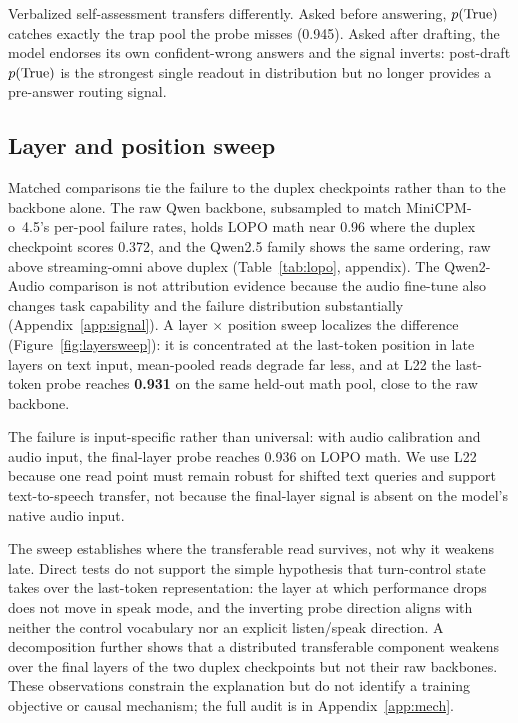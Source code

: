 Verbalized self-assessment transfers differently. Asked before
answering, $p(\mathrm{True})$ catches exactly the trap pool the probe misses
(0.945). Asked after drafting, the model endorses its own
confident-wrong answers and the signal inverts: post-draft $p(\mathrm{True})$
is the strongest single readout in distribution but no longer
provides a pre-answer routing signal.

\subsection{Layer and position sweep}
\label{sec:duplex}

Matched comparisons tie the failure to the duplex checkpoints rather
than to the backbone alone. The raw Qwen backbone, subsampled to
match MiniCPM-o~4.5's per-pool failure rates, holds LOPO math near
0.96 where the duplex checkpoint scores 0.372, and the Qwen2.5 family
shows the same ordering, raw above streaming-omni above duplex
(Table~\ref{tab:lopo}, appendix). The Qwen2-Audio comparison is not
attribution evidence because the audio fine-tune also changes task
capability and the failure distribution substantially
(Appendix~\ref{app:signal}). A layer $\times$ position sweep
localizes the difference (Figure~\ref{fig:layersweep}): it is
concentrated at the last-token position in late layers on text input,
mean-pooled reads degrade far less, and at L22 the last-token probe
reaches \textbf{0.931} on the same held-out math pool, close to the
raw backbone.

The failure is input-specific rather than universal: with audio
calibration and audio input, the final-layer probe reaches 0.936 on
LOPO math. We use L22 because one read point must remain robust for
shifted text queries and support text-to-speech transfer, not because
the final-layer signal is absent on the model's native audio input.

The sweep establishes where the transferable read survives, not
why it weakens late. Direct tests do not support the simple
hypothesis that turn-control state takes over the last-token
representation: the layer at which performance drops does not move in
speak mode, and the inverting probe direction aligns with neither the
control vocabulary nor an explicit listen/speak direction. A
decomposition further shows that a distributed transferable component
weakens over the final layers of the two duplex checkpoints but not
their raw backbones. These observations constrain the explanation but
do not identify a training objective or causal mechanism; the full
audit is in Appendix~\ref{app:mech}.

